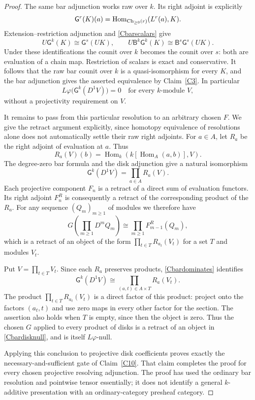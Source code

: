 \begin{proof}
The same bar adjunction works raw over $k$. Its right adjoint is explicitly
\[
 \mathsf G^r(K)(a)=
 \operatorname{Hom}_{\operatorname{Ch}_{\geq0}(r)}(L^r(a),K).
\]
Extension--restriction adjunction and \eqref{Cbarscalars} give
\[
 U\mathsf G^k(K)\cong\mathsf G^s(UK),\qquad
 U\mathsf B^k\mathsf G^k(K)
 \cong\mathsf B^s\mathsf G^s(UK).
\]
Under these identifications the counit over $k$ becomes the counit over $s$: both are evaluation of a chain map. Restriction of scalars is exact and conservative. It follows that the raw bar counit over $k$ is a quasi-isomorphism for every $K$, and the bar adjunction gives the asserted equivalence by Claim~\ref{C3}. In particular
\[
 L\varphi\bigl(\mathsf G^k(D^1 V)\bigr)=0
 \quad\text{for every }k\text{-module }V,
 \tag{C-bar-disk-null}\label{Cbardisknull}
\]
without a projectivity requirement on $V$.

It remains to pass from this particular resolution to an arbitrary chosen $F$. We give the retract argument explicitly, since homotopy equivalence of resolutions alone does not automatically settle their raw right adjoints. For $a\in A$, let $R_a$ be the right adjoint of evaluation at $a$. Thus
\[
 R_a(V)(b)=\operatorname{Hom}_k(k[\operatorname{Hom}_A(a,b)],V).
\]
The degree-zero bar formula and the disk adjunction give a natural isomorphism
\[
 \mathsf G^k(D^1V)=\prod_{a\in A}R_a(V).
 \tag{C-bar-dominates}\label{Cbardominates}
\]
Each projective component $F_n$ is a retract of a direct sum of evaluation functors. Its right adjoint $F_n^R$ is consequently a retract of the corresponding product of the $R_a$. For any sequence $(Q_m)_{m\geq1}$ of modules we therefore have
\[
 G\!\left(\prod_{m\geq1}D^mQ_m\right)
 \cong\prod_{m\geq1}F_{m-1}^R(Q_m),
\]
which is a retract of an object of the form $\prod_{t\in T}R_{a_t}(V_t)$ for a set $T$ and modules $V_t$.

Put $V=\prod_{t\in T}V_t$. Since each $R_a$ preserves products, \eqref{Cbardominates} identifies
\[
 \mathsf G^k(D^1V)
 \cong\prod_{(a,t)\in A\times T}R_a(V_t).
\]
The product $\prod_{t\in T}R_{a_t}(V_t)$ is a direct factor of this product: project onto the factors $(a_t,t)$ and use zero maps in every other factor for the section. The assertion also holds when $T$ is empty, since then the object is zero. Thus the chosen $G$ applied to every product of disks is a retract of an object in \eqref{Cbardisknull}, and is itself $L\varphi$-null.

Applying this conclusion to projective disk coefficients proves exactly the necessary-and-sufficient gate of Claim~\ref{C10}. That claim completes the proof for every chosen projective resolving adjunction. The proof has used the ordinary bar resolution and pointwise tensor essentially; it does not identify a general $k$-additive presentation with an ordinary-category presheaf category.
\end{proof}



